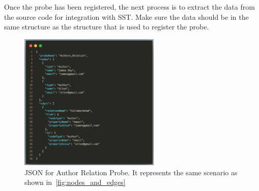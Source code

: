 Once the probe has been registered, the next process is to extract the data from the source code for integration with SST. Make sure the data should be in the same structure as the structure that is used to register the probe. 

\begin{figure}[H]
    \centering
    \includegraphics[width=0.60\textwidth]{figures/author_relation_int.png}
    \caption{JSON for Author Relation Probe. It represents the same scenario as shown in~\ref{fig:nodes_and_edges}}
    \label{fig:json_author_relation_int}
\end{figure}